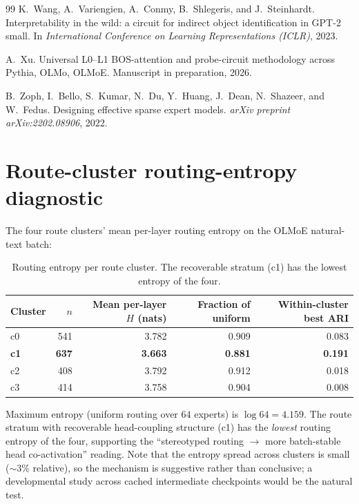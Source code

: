 \documentclass[11pt]{article}
\begin{document}
\begin{thebibliography}{99}
K.~Wang, A.~Variengien, A.~Conmy, B.~Shlegeris, and J.~Steinhardt.
\newblock Interpretability in the wild: a circuit for indirect object
  identification in GPT-2 small.
\newblock In \emph{International Conference on Learning Representations
  (ICLR)}, 2023.

A.~Xu.
\newblock Universal L0--L1 BOS-attention and probe-circuit methodology
  across Pythia, OLMo, OLMoE.
\newblock Manuscript in preparation, 2026.

B.~Zoph, I.~Bello, S.~Kumar, N.~Du, Y.~Huang, J.~Dean, N.~Shazeer, and
  W.~Fedus.
\newblock Designing effective sparse expert models.
\newblock \emph{arXiv preprint arXiv:2202.08906}, 2022.

\end{thebibliography}

\appendix

\section{Route-cluster routing-entropy diagnostic}

The four route clusters' mean per-layer routing entropy on the OLMoE
natural-text batch:

\begin{table}[h]
\centering
\begin{tabular}{lrrrr}
\toprule
Cluster & $n$ & Mean per-layer $H$ (nats) & Fraction of uniform & Within-cluster best ARI \\
\midrule
c0 & 541 & 3.782 & 0.909 & 0.083 \\
\textbf{c1} & \textbf{637} & \textbf{3.663} & \textbf{0.881} & \textbf{0.191} \\
c2 & 408 & 3.792 & 0.912 & 0.018 \\
c3 & 414 & 3.758 & 0.904 & 0.008 \\
\bottomrule
\end{tabular}
\caption{Routing entropy per route cluster. The recoverable stratum
(c1) has the lowest entropy of the four.}
\label{tab:entropy-diagnostic}
\end{table}

Maximum entropy (uniform routing over $64$ experts) is $\log 64 = 4.159$.
The route stratum with recoverable head-coupling structure (c1) has the
\emph{lowest} routing entropy of the four, supporting the ``stereotyped
routing $\to$ more batch-stable head co-activation'' reading. Note that
the entropy spread across clusters is small ($\sim 3\%$ relative), so the
mechanism is suggestive rather than conclusive; a developmental study
across cached intermediate checkpoints would be the natural test.
\end{document}

